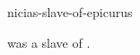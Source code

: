 \documentclass{stex}
\begin{document}
\begin{smodule}{nicias-slave-of-epicurus}
\begin{sparagraph}[style=symdoc]
 was a slave of .
\end{sparagraph}
\end{smodule}
\end{document}

